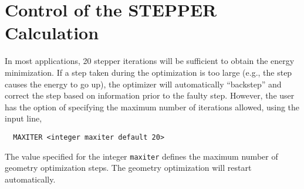 \section{Control of the STEPPER Calculation}


In most applications, 20 stepper iterations will be sufficient to obtain
the energy minimization.  If a step taken during the
optimization is too large (e.g., the step causes the energy to go up), 
the optimizer will automatically ``backstep'' and correct the step 
based on information prior to the faulty step.  However, the user has 
the option of specifying 
the maximum number of iterations allowed, using the input line,

\begin{verbatim}
  MAXITER <integer maxiter default 20>
\end{verbatim}

The value specified for the integer \verb+maxiter+ defines the maximum 
number of geometry optimization steps.  The
geometry optimization will restart automatically.







